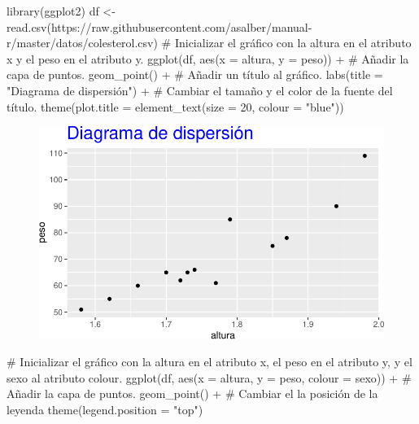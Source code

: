 \documentclass[
  a4paper,
]{scrreport}
\newenvironment{Shaded}{\begin{snugshade}}{\end{snugshade}}
\newcommand{\AttributeTok}[1]{\textcolor[rgb]{0.40,0.45,0.13}{#1}}
\newcommand{\CommentTok}[1]{\textcolor[rgb]{0.37,0.37,0.37}{#1}}
\newcommand{\DecValTok}[1]{\textcolor[rgb]{0.68,0.00,0.00}{#1}}
\newcommand{\FunctionTok}[1]{\textcolor[rgb]{0.28,0.35,0.67}{#1}}
\newcommand{\NormalTok}[1]{\textcolor[rgb]{0.00,0.23,0.31}{#1}}
\newcommand{\OtherTok}[1]{\textcolor[rgb]{0.00,0.23,0.31}{#1}}
\newcommand{\SpecialCharTok}[1]{\textcolor[rgb]{0.37,0.37,0.37}{#1}}
\newcommand{\StringTok}[1]{\textcolor[rgb]{0.13,0.47,0.30}{#1}}
\theoremstyle{definition}
\theoremstyle{definition}
\theoremstyle{remark}
\begin{document}
\begin{Shaded}
\begin{Highlighting}[]
\FunctionTok{library}\NormalTok{(ggplot2)}
\NormalTok{df }\OtherTok{\textless{}{-}} \FunctionTok{read.csv}\NormalTok{(}\StringTok{\textquotesingle{}https://raw.githubusercontent.com/asalber/manual{-}r/master/datos/colesterol.csv\textquotesingle{}}\NormalTok{)}
\CommentTok{\# Inicializar el gráfico con la altura en el atributo x y el peso en el atributo y.}
\FunctionTok{ggplot}\NormalTok{(df, }\FunctionTok{aes}\NormalTok{(}\AttributeTok{x =}\NormalTok{ altura, }\AttributeTok{y =}\NormalTok{ peso)) }\SpecialCharTok{+}
\CommentTok{\# Añadir la capa de puntos.}
    \FunctionTok{geom\_point}\NormalTok{() }\SpecialCharTok{+}
\CommentTok{\# Añadir un título al gráfico.}
    \FunctionTok{labs}\NormalTok{(}\AttributeTok{title =} \StringTok{"Diagrama de dispersión"}\NormalTok{) }\SpecialCharTok{+}
\CommentTok{\# Cambiar el tamaño y el color de la fuente del título.}
    \FunctionTok{theme}\NormalTok{(}\AttributeTok{plot.title =} \FunctionTok{element\_text}\NormalTok{(}\AttributeTok{size =} \DecValTok{20}\NormalTok{, }\AttributeTok{colour =} \StringTok{"blue"}\NormalTok{))}
\end{Highlighting}
\end{Shaded}

\begin{figure}[H]

{\centering \includegraphics{07-graficos_files/figure-pdf/unnamed-chunk-30-1.pdf}

}

\end{figure}

\begin{Shaded}
\begin{Highlighting}[]
\CommentTok{\# Inicializar el gráfico con la altura en el atributo x, el peso en el atributo y, y el sexo al atributo colour.}
\FunctionTok{ggplot}\NormalTok{(df, }\FunctionTok{aes}\NormalTok{(}\AttributeTok{x =}\NormalTok{ altura, }\AttributeTok{y =}\NormalTok{ peso, }\AttributeTok{colour =}\NormalTok{ sexo)) }\SpecialCharTok{+}
\CommentTok{\# Añadir la capa de puntos.}
    \FunctionTok{geom\_point}\NormalTok{() }\SpecialCharTok{+}
\CommentTok{\# Cambiar el la posición de la leyenda}
    \FunctionTok{theme}\NormalTok{(}\AttributeTok{legend.position =} \StringTok{"top"}\NormalTok{)}
\end{Highlighting}
\end{Shaded}
\end{document}
